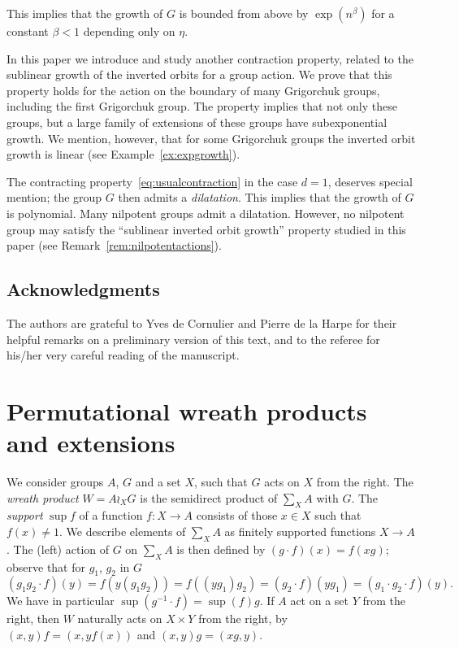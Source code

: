 \documentclass{amsart}
\theoremstyle{definition}
\begin{document}
This implies that the growth of $G$ is bounded from above by
$\exp(n^\beta)$ for a constant $\beta<1$ depending only on $\eta$.

In this paper we introduce and study another contraction property,
related to the sublinear growth of the inverted orbits for a group
action. We prove that this property holds for the action on the
boundary of many Grigorchuk groups, including the first Grigorchuk
group. The property implies that not only these groups, but a large
family of extensions of these groups have subexponential growth. We
mention, however, that for some Grigorchuk groups the inverted orbit
growth is linear (see Example~\ref{ex:expgrowth}).

The contracting property~\eqref{eq:usualcontraction} in the case
$d=1$, deserves special mention; the group $G$ then admits a {\it
  dilatation}. This implies that the growth of $G$ is polynomial.
Many nilpotent groups admit a dilatation. However, no nilpotent group
may satisfy the ``sublinear inverted orbit growth'' property studied in
this paper (see Remark~\ref{rem:nilpotentactions}).

\subsection{Acknowledgments} The authors are grateful to Yves de
Cornulier and Pierre de la Harpe for their helpful remarks on a
preliminary version of this text, and to the referee for his/her
very careful reading of the manuscript.

\section{Permutational wreath products and extensions}
We consider groups $A$, $G$ and a set $X$, such that $G$ acts on $X$
from the right. The \emph{wreath product} $W=A\wr_XG$ is the
semidirect product of $\sum_X A$ with $G$.  The \emph{support} $\sup
f$ of a function $f:X\to A$ consists of those $x\in X$ such that
$f(x)\neq1$.  We describe elements of $\sum_XA$ as finitely supported
functions $X\to A$.  The (left) action of $G$ on $\sum_X A$ is then
defined by $(g\cdot f)(x) = f(xg)$; observe that for $g_1$, $g_2$ in
$G$
\[
(g_1g_2\cdot f)(y) = f(y(g_1g_2)) = f((yg_1)g_2) = (g_2\cdot f)(yg_1) = (g_1\cdot g_2\cdot f)(y).
\]
We have in particular $\sup(g^{-1}\cdot f)=\sup(f)g$.  If $A$ act on a
set $Y$ from the right, then $W$ naturally acts on $X\times Y$ from
the right, by $(x,y)f=(x,yf(x))$ and $(x,y)g=(xg,y)$.
\end{document}
